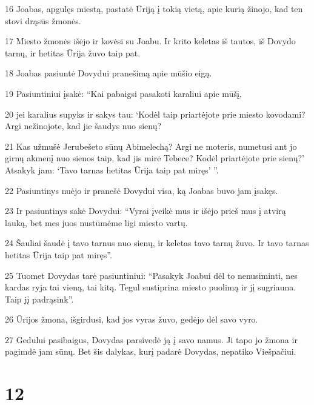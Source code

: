 \par 16 Joabas, apgulęs miestą, pastatė Ūriją į tokią vietą, apie kurią žinojo, kad ten stovi drąsūs žmonės. 
\par 17 Miesto žmonės išėjo ir kovėsi su Joabu. Ir krito keletas iš tautos, iš Dovydo tarnų, ir hetitas Ūrija žuvo taip pat. 
\par 18 Joabas pasiuntė Dovydui pranešimą apie mūšio eigą. 
\par 19 Pasiuntiniui įsakė: “Kai pabaigsi pasakoti karaliui apie mūšį, 
\par 20 jei karalius supyks ir sakys tau: ‘Kodėl taip priartėjote prie miesto kovodami? Argi nežinojote, kad jie šaudys nuo sienų? 
\par 21 Kas užmušė Jerubešeto sūnų Abimelechą? Argi ne moteris, numetusi ant jo girnų akmenį nuo sienos taip, kad jis mirė Tebece? Kodėl priartėjote prie sienų?’ Atsakyk jam: ‘Tavo tarnas hetitas Ūrija taip pat miręs’ ”. 
\par 22 Pasiuntinys nuėjo ir pranešė Dovydui visa, ką Joabas buvo jam įsakęs. 
\par 23 Ir pasiuntinys sakė Dovydui: “Vyrai įveikė mus ir išėjo prieš mus į atvirą lauką, bet mes juos nustūmėme ligi miesto vartų. 
\par 24 Šauliai šaudė į tavo tarnus nuo sienų, ir keletas tavo tarnų žuvo. Ir tavo tarnas hetitas Ūrija taip pat miręs”. 
\par 25 Tuomet Dovydas tarė pasiuntiniui: “Pasakyk Joabui dėl to nenusiminti, nes kardas ryja tai vieną, tai kitą. Tegul sustiprina miesto puolimą ir jį sugriauna. Taip jį padrąsink”. 
\par 26 Ūrijos žmona, išgirdusi, kad jos vyras žuvo, gedėjo dėl savo vyro. 
\par 27 Gedului pasibaigus, Dovydas parsivedė ją į savo namus. Ji tapo jo žmona ir pagimdė jam sūnų. Bet šis dalykas, kurį padarė Dovydas, nepatiko Viešpačiui.



\chapter{12}

